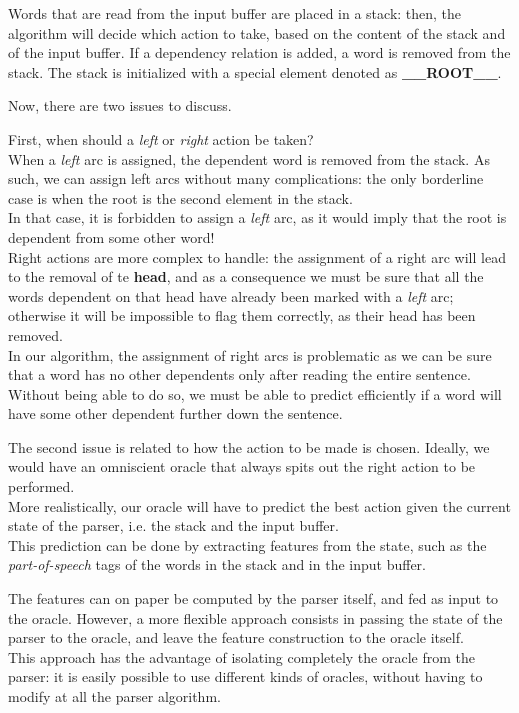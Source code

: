 \documentclass[
12pt,
a4paper,
oneside,
headinclude,
footinclude]{article}
\begin{document}
    Words that are read from the input buffer are placed in a stack: then, the algorithm will decide which action to take, based on the content of the stack and of the input buffer. If a dependency relation is added, a word is removed from the stack. The stack is initialized with a special element denoted as \textbf{\_\_ROOT\_\_}.
    
    Now, there are two issues to discuss.
    
    First, when should a \textit{left} or \textit{right} action be taken?\\
    When a \textit{left} arc is assigned, the dependent word is removed from the stack. As such, we can assign left arcs without many complications: the only borderline case is when the root is the second element in the stack.\\
    In that case, it is forbidden to assign a \textit{left} arc, as it would imply that the root is dependent from some other word!\\
    Right actions are more complex to handle: the assignment of a right arc will lead to the removal of te \textbf{head}, and as a consequence we must be sure that all the words dependent on that head have already been marked with a \textit{left} arc; otherwise it will be impossible to flag them correctly, as their head has been removed.\\
    In our algorithm, the assignment of right arcs is problematic as we can be sure that a word has no other dependents only after reading the entire sentence. Without being able to do so, we must be able to predict efficiently if a word will have some other dependent further down the sentence.
    
    The second issue is related to how the action to be made is chosen. Ideally, we would have an omniscient oracle that always spits out the right action to be performed.\\
    More realistically, our oracle will have to predict the best action given the current state of the parser, i.e. the stack and the input buffer. \\
    This prediction can be done by extracting features from the state, such as the \textit{part-of-speech} tags of the words in the stack and in the input buffer.
    
    The features can on paper be computed by the parser itself, and fed as input to the oracle. However, a more flexible approach consists in passing the state of the parser to the oracle, and leave the feature construction to the oracle itself. \\
    This approach has the advantage of isolating completely the oracle from the parser: it is easily possible to use different kinds of oracles, without having to modify at all the parser algorithm. 
    
\end{document}
